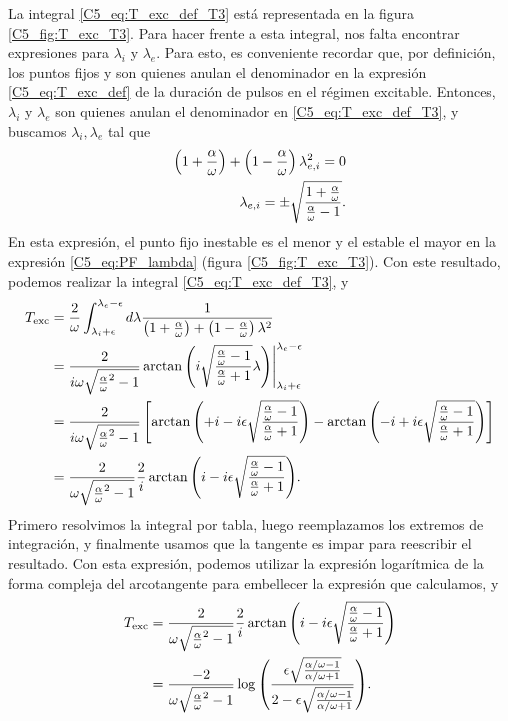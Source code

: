 \documentclass[./main.tex]{subfiles}
\begin{document}
La integral \ref{C5_eq:T_exc_def_T3} está representada en la figura \ref{C5_fig:T_exc_T3}. Para hacer frente a esta integral, nos falta encontrar expresiones para $\lambda_i$ y $\lambda_e$. Para esto, es conveniente recordar que, por definición, los puntos fijos \xxi y \xxe son quienes anulan el denominador en la expresión \ref{C5_eq:T_exc_def} de la duración de pulsos en el régimen excitable. Entonces, $\lambda_i$ y $\lambda_e$ son quienes anulan el denominador en \ref{C5_eq:T_exc_def_T3}, y buscamos $\lambda_i,\lambda_e$ tal que 
\begin{align}
    \left(1+\frac{\alpha}{\omega} \right) + \left(1-\frac{\alpha}{\omega} \right) \lambda_{e,i}^2 = 0 \nonumber\\
    \lambda_{e,i} = \pm \sqrt{\frac{1+\frac{\alpha}{\omega}}{\frac{\alpha}{\omega}-1}}. \label{C5_eq:PF_lambda}
\end{align}
En esta expresión, el punto fijo inestable es el menor y el estable el mayor en la expresión \ref{C5_eq:PF_lambda} (figura \ref{C5_fig:T_exc_T3}). Con este resultado, podemos realizar la integral \ref{C5_eq:T_exc_def_T3}, y
\begin{align}
    T_{\text{exc}} &= \frac{2}{\omega}\int_{\lambda_i + \epsilon}^{\lambda_e - \epsilon} d\lambda \frac{1}{\left(1+\ddelta\right) + \left(1-\ddelta\right) \lambda^2} \nonumber\\
    &= \frac{2}{i\omega \sqrt{\ddelta^2 - 1}} \arctan{\left(i\sqrt{\frac{\ddelta - 1}{\ddelta + 1} } \lambda\right)} \Bigg|_{\lambda_i + \epsilon}^{\lambda_e - \epsilon} \nonumber\\
    &= \frac{2}{i \omega \sqrt{\ddelta^2 - 1}}  \left[ \arctan{\left( +i - i \epsilon \sqrt{\frac{\ddelta - 1}{\ddelta + 1}}\right)}  - \arctan{\left( -i +i \epsilon \sqrt{\frac{\ddelta - 1}{\ddelta + 1}}\right)} \right] \nonumber\\
    &= \frac{2}{\omega \sqrt{\ddelta^2 - 1}}  \frac{2}{i} \arctan{\left( i - i \epsilon \sqrt{\frac{\ddelta - 1}{\ddelta + 1}}\right)}.
\end{align}
Primero resolvimos la integral por tabla, luego reemplazamos los extremos de integración, y finalmente usamos que la tangente es impar para reescribir el resultado. Con esta expresión, podemos utilizar la expresión logarítmica de la forma compleja del arcotangente para embellecer la expresión que calculamos, y 
\begin{align}
    T_{\text{exc}} &= \frac{2}{\omega \sqrt{\ddelta^2 - 1}}  \frac{2}{i} \arctan{\left( i - i \epsilon \sqrt{\frac{\ddelta - 1}{\ddelta + 1}}\right)} \nonumber\\
    &= \frac{-2}{ \omega \sqrt{\ddelta^2 - 1}}  \log{\left( \frac{\epsilon \sqrt{\frac{\dddelta - 1}{\dddelta + 1}}}{2-\epsilon \sqrt{\frac{\dddelta - 1}{\dddelta + 1}}}\right)}. \nonumber
\end{align}
\end{document}
